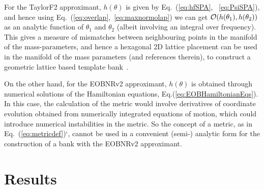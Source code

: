For the TaylorF2 approximant, $h(\theta)$ is given by Eq.~(\ref{eq:hfSPA},
~\ref{eq:PsiSPA}), and hence using Eq.~(\ref{eq:overlap},~\ref{eq:maxnormolap}) we 
can get $\mathcal{O}(h(\theta_1),h(\theta_2))$ as an analytic function of $\theta_1$ 
and $\theta_2$ (albeit involving an integral over frequency).
This gives a measure of mismatches between neighbouring points in the manifold 
of the mass-parameters, and hence a hexagonal 2D lattice placement can be used 
in the manifold of the mass parameters \cite{SathyaMetric2PN} (and references therein), 
to construct a geometric lattice based template bank~\cite{SathyaBankPlacementTauN,OwenTemplateSpacing,SathyaMetric2PN}. 
 
On the other hand, for the EOBNRv2 approximant, $h(\theta)$ is obtained through 
numerical solutions of the Hamiltonian equations, Eq.(\ref{eq:EOBHamiltonianEqs}). 
In this case, the calculation of the metric would involve derivatives of coordinate
evolution obtained from numerically integrated equations of motion, 
which could introduce numerical instabilities in the metric. So the concept of 
a metric, as in Eq.~(\ref{eq:metricdef})`, cannot be used in a convenient (semi-) 
analytic form for the construction of a bank with the EOBNRv2 approximant.

\section{Results}
\label{s:results}

